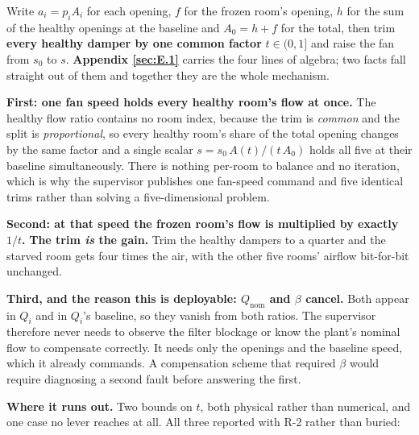 Write $a_i = p_i A_i$ for each opening, $f$ for the frozen room's opening, $h$ for the sum of the
healthy openings at the baseline and $A_0 = h + f$ for the total, then trim \textbf{every healthy
damper by one common factor} $t \in (0,1]$ and raise the fan from $s_0$ to $s$. \textbf{Appendix \ref{sec:E.1}}
carries the four lines of algebra; two facts fall straight out of them and together they are the
whole mechanism.

\textbf{First: one fan speed holds every healthy room's flow at once.} The healthy flow ratio
contains no room index, because the trim is \emph{common} and the split is \emph{proportional}, so
every healthy room's share of the total opening changes by the same factor and a single scalar
$s = s_0\,A(t)/(t\,A_0)$ holds all five at their baseline simultaneously. There is nothing per-room
to balance and no iteration, which is why the supervisor publishes one fan-speed command and five
identical trims rather than solving a five-dimensional problem.

\textbf{Second: at that speed the frozen room's flow is multiplied by exactly $1/t$.}
\textbf{The trim \emph{is} the gain.} Trim the healthy dampers to a quarter and the starved room gets
four times the air, with the other five rooms' airflow bit-for-bit unchanged.

\textbf{Third, and the reason this is deployable: $Q_\text{nom}$ and $\beta$ cancel.} Both appear
in $Q_i$ and in $Q_i$'s baseline, so they vanish from both ratios. The supervisor therefore
never needs to observe the filter blockage or know the plant's nominal flow to compensate
correctly. It needs only the openings and the baseline speed, which it already commands. A
compensation scheme that required $\beta$ would require diagnosing a second fault before answering
the first.

\textbf{Where it runs out.} Two bounds on $t$, both physical rather than numerical, and one case
no lever reaches at all. All three reported with R-2 rather than buried:

